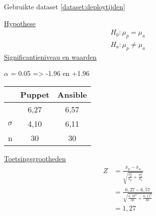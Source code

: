 Gebruikte dataset \ref{dataset:deploytijden}

\underline{Hypothese}
\begin{align*}
H_0:  \mu_p = \mu_a \\
H_a: \mu_p\neq \mu_a 
\end{align*}
\underline{Significantieniveau en waarden} \newline

 $\alpha$ = 0.05 => -1.96 en +1.96 \newline

		\begin{tabular}{ r |c |c }
			& Puppet & Ansible\\\hline
			\unexpanded{$ \bar x  $} &  6,27 & 6,57\\ \hline
			$\sigma$ & 4,10 & 6,11\\ \hline
			n &  30 &  30

\end{tabular}


\underline{Toetsingsgrootheden}
\begin{equation} \label{eq1}
\begin{split}
Z &= \tfrac{\bar x_p - \bar x_a}{\sqrt{\tfrac{\sigma_p^2}{n_p}+\tfrac{\sigma_a^2}{n_a}}}\\
& = \tfrac{ 6,27 - 6,57}{\sqrt{\tfrac{ 4,10 ^2}{30}+\tfrac{ 6,11^2}{30}}} \\
& = 1,27
\end{split}
\end{equation}
